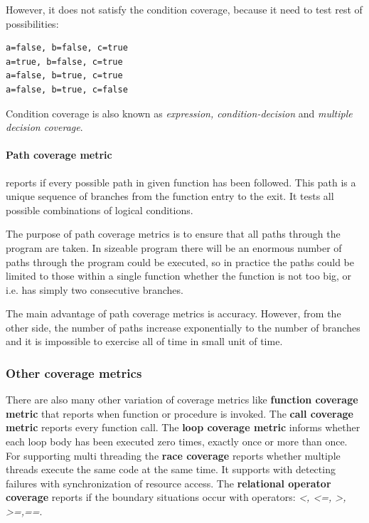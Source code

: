 However, it does not satisfy the condition coverage, because it need to test rest of possibilities:
\begin{verbatim}
a=false, b=false, c=true
a=true, b=false, c=true
a=false, b=true, c=true
a=false, b=true, c=false
\end{verbatim}

Condition coverage is also known as \textit{expression, condition-decision} and \textit{multiple decision coverage}.
\paragraph{Path coverage metric} reports if every possible path in given function has been followed. This path is a unique sequence of branches from the function entry to the exit. It tests all possible combinations of logical conditions. 

The purpose of path coverage metrics is to ensure that all paths through the program are taken. In sizeable program there will be an enormous number of paths through the program could be executed, so in practice the paths could be limited to those within a single function whether the function is not too big, or i.e. has simply two consecutive branches.

The main advantage of path coverage metrics is accuracy. However, from the other side, the number of paths increase exponentially to the number of branches and it is impossible to exercise all of time in small unit of time.  

\subsubsection{Other coverage metrics} 
There are also many other variation of coverage metrics like\textbf{ function coverage metric} that reports when function or procedure is invoked. The \textbf{call coverage metric} reports every function call. The \textbf{ loop coverage metric} informs whether each loop body has been executed zero times, exactly once or more than once. For supporting multi threading the \textbf{race coverage} reports whether multiple threads execute the same code at the same time. It supports with detecting failures with synchronization of resource access. The \textbf{relational operator coverage} reports if the boundary situations occur with operators: \textit{\textless, \textless=, \textgreater, \textgreater=,==}. 

